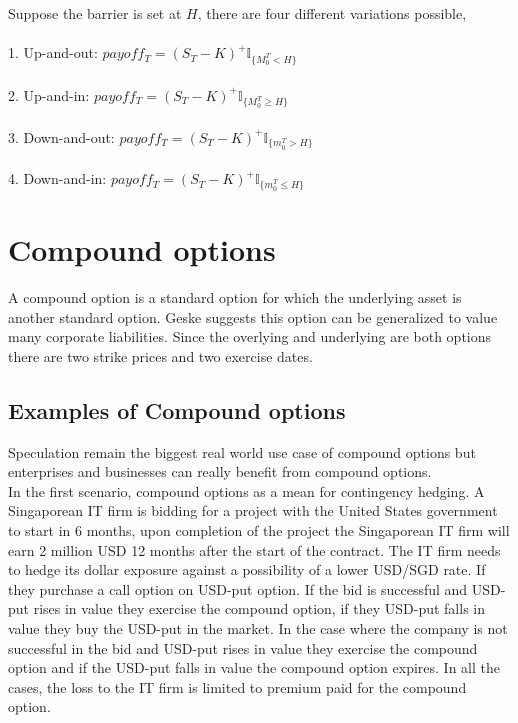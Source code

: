 \documentclass{article}
\begin{document}
Suppose the barrier is set at $H$, there are four different variations possible, \\
\\1. Up-and-out: $payoff_T = (S_T-K)^{+}\mathbb{I}_{\{M_0^T<H\}}$  \\
\\2. Up-and-in:  $payoff_T = (S_T-K)^{+}\mathbb{I}_{\{M_0^T \geq H\}}$\\
\\3. Down-and-out: $payoff_T = (S_T-K)^{+}\mathbb{I}_{\{m_0^T>H\}}$ \\
\\4. Down-and-in:  $payoff_T = (S_T-K)^{+}\mathbb{I}_{\{m_0^T \leq H\}}$\\

\section{Compound options
}
A compound option is a standard option for which the underlying asset is another standard option. Geske \cite{Geske1} suggests this option can be generalized to value many corporate liabilities.  Since the overlying and underlying are both options there are two strike prices and two exercise dates. 

\subsection{Examples of Compound options
}
Speculation remain the biggest real world use case of compound options but enterprises and businesses can really benefit from compound options.\\

In the first scenario, compound options as a mean for contingency hedging. A Singaporean IT firm is bidding for a project with the United States government to start in 6 months, upon completion of the project the Singaporean IT firm will earn 2 million USD 12 months after the start of the contract.  The IT firm needs to hedge its dollar exposure against a possibility of a lower USD/SGD rate.  If they purchase a call option on USD-put option.  If the bid is successful and USD-put rises in value they exercise the compound option, if they USD-put falls in value they buy the USD-put in the market.  In the case where the company is not successful in the bid and USD-put rises in value they exercise the compound option and if the USD-put falls in value the compound option expires.  In all the cases, the loss to the IT firm is limited to premium paid for the compound option.\\
\end{document}

